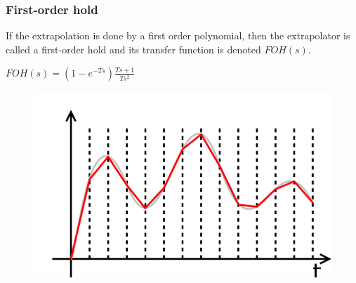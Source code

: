 \begin{frame}
	\frametitle{First-order hold}
	If the extrapolation is done by a first order polynomial, then the extrapolator is called a first-order hold and its transfer function is denoted $FOH(s)$. 
	\begin{center}
		$FOH(s)=(1-e^{-Ts})\frac{Ts+1}{Ts^2}$
	\end{center}
	\vspace{-4ex}
	\begin{figure}
		\includegraphics[width=0.7\linewidth]{foh}
	\end{figure}
\end{frame}

